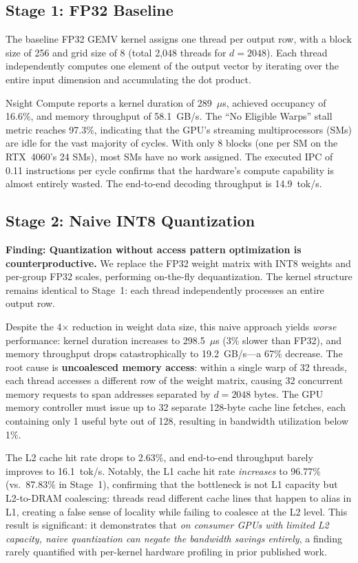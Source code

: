 \documentclass[conference]{IEEEtran}
\begin{document}
\subsection{Stage 1: FP32 Baseline}
The baseline FP32 GEMV kernel assigns one thread per output row, with a block size of 256 and grid size of 8 (total 2,048 threads for $d=2048$). Each thread independently computes one element of the output vector by iterating over the entire input dimension and accumulating the dot product.

Nsight Compute reports a kernel duration of 289~$\mu$s, achieved occupancy of 16.6\%, and memory throughput of 58.1~GB/s. The ``No Eligible Warps'' stall metric reaches 97.3\%, indicating that the GPU's streaming multiprocessors (SMs) are idle for the vast majority of cycles. With only 8 blocks (one per SM on the RTX~4060's 24 SMs), most SMs have no work assigned. The executed IPC of 0.11 instructions per cycle confirms that the hardware's compute capability is almost entirely wasted. The end-to-end decoding throughput is 14.9~tok/s.

\subsection{Stage 2: Naive INT8 Quantization}

\textbf{Finding: Quantization without access pattern optimization is counterproductive.} We replace the FP32 weight matrix with INT8 weights and per-group FP32 scales, performing on-the-fly dequantization. The kernel structure remains identical to Stage~1: each thread independently processes an entire output row.

Despite the 4$\times$ reduction in weight data size, this naive approach yields \emph{worse} performance: kernel duration increases to 298.5~$\mu$s (3\% slower than FP32), and memory throughput drops catastrophically to 19.2~GB/s---a 67\% decrease. The root cause is \textbf{uncoalesced memory access}: within a single warp of 32 threads, each thread accesses a different row of the weight matrix, causing 32 concurrent memory requests to span addresses separated by $d=2048$ bytes. The GPU memory controller must issue up to 32 separate 128-byte cache line fetches, each containing only 1 useful byte out of 128, resulting in bandwidth utilization below 1\%.

The L2 cache hit rate drops to 2.63\%, and end-to-end throughput barely improves to 16.1~tok/s. Notably, the L1 cache hit rate \emph{increases} to 96.77\% (vs.\ 87.83\% in Stage~1), confirming that the bottleneck is not L1 capacity but L2-to-DRAM coalescing: threads read different cache lines that happen to alias in L1, creating a false sense of locality while failing to coalesce at the L2 level. This result is significant: it demonstrates that \emph{on consumer GPUs with limited L2 capacity, naive quantization can negate the bandwidth savings entirely}, a finding rarely quantified with per-kernel hardware profiling in prior published work.
\end{document}
